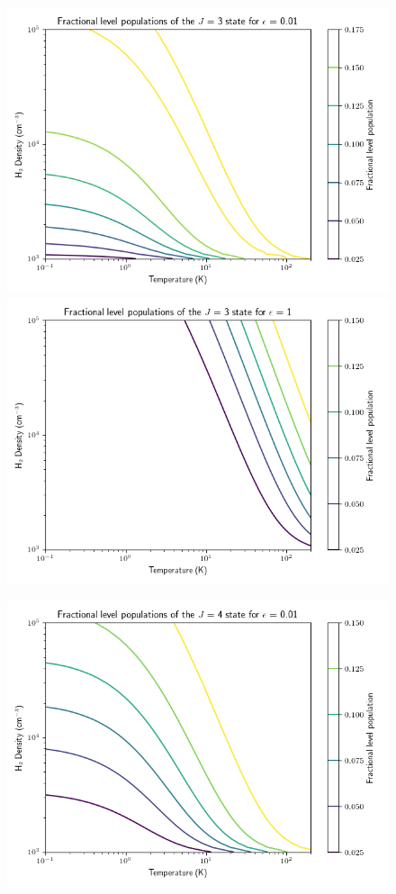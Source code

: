 \documentclass[11pt]{article}
\newenvironment{tight_enumerate}{
\begin{enumerate}[label=(\alph*)]
\setlength{\itemsep}{3pt}
\setlength{\parskip}{0pt}
}{\end{enumerate}}
\begin{document}
\begin{tight_enumerate}
\begin{figure}[H]
\vspace{-2.5em}
\end{figure}
\begin{figure}[H]
\centering
\includegraphics[height=0.25\textheight]{1/3_0.png}
\includegraphics[height=0.25\textheight]{1/3_1.png}
\vspace{-2.5em}
\end{figure}
\begin{figure}[H]
\centering
\includegraphics[height=0.25\textheight]{1/4_0.png}

\end{figure}
\end{tight_enumerate}
\end{document}
